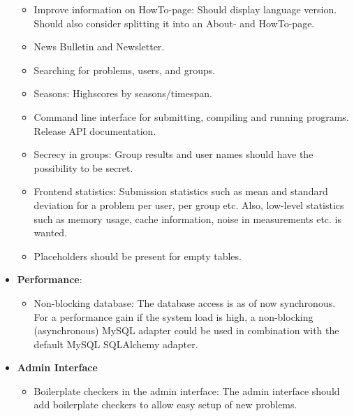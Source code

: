 \begin{itemize}
\begin{itemize}
        \item Improve information on HowTo-page: Should display language version. Should also consider splitting it into an About- and HowTo-page.
        \item News Bulletin and Newsletter.
        \item Searching for problems, users, and groups.
        \item Seasons: Highscores by seasons/timespan.
        \item Command line interface for submitting, compiling and running programs. Release API documentation.
        \item Secrecy in groups: Group results and user names should have the possibility to be secret.
        \item Frontend statistics: Submission statistics such as mean and standard deviation for a problem per user, per group etc. Also, low-level statistics such as memory usage, cache information, noise in measurements etc. is wanted.
        \item Placeholders should be present for empty tables.
    \end{itemize}
\item \textbf{Performance}:
    \begin{itemize}
      \item Non-blocking database: The database access is as of now synchronous. For a performance gain if the system load is high, a non-blocking (asynchronous) MySQL adapter could be used in combination with the default MySQL SQLAlchemy adapter.
    \end{itemize}
\item \textbf{Admin Interface}
    \begin{itemize}
      \item Boilerplate checkers in the admin interface: The admin interface should add boilerplate checkers to allow easy setup of new problems.
    \end{itemize}
\end{itemize}
